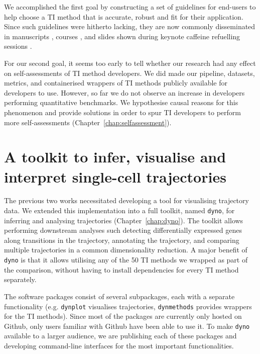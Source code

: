 We accomplished the first goal by constructing a set of guidelines for end-users to help choose a TI method that is accurate, robust and fit for their application. 
Since such guidelines were hitherto lacking, they are now commonly disseminated in manuscripts \cite{lafzi_tutorialguidelinesexperimental_2018,luecken_currentbestpractices_2019}, courses \cite{kiselev_analysissinglecell_2019,martens_analysissinglecell_2019}, and slides shown during keynote caffeine refuelling sessions \cite{hemberg_coffeebreakanalysis_2019}. 

For our second goal, it seems too early to tell whether our research had any effect on self-assessments of TI method developers. We did made our pipeline, datasets, metrics, and containerised wrappers of TI methods publicly available for developers to use.
However, so far we do not observe an increase in developers performing quantitative benchmarks. We hypothesise causal reasons for this phenomenon and provide solutions in order to spur TI developers to perform more self-assessments (Chapter~\ref{chap:selfassessment}).

\section{A toolkit to infer, visualise and interpret single-cell trajectories}

The previous two works necessitated developing a tool for visualising trajectory data. We extended this implementation into a full toolkit, named \texttt{dyno}, for inferring and analysing trajectories (Chapter~\ref{chap:dyno}). The toolkit allows performing downstream analyses such detecting differentially expressed genes along transitions in the trajectory, annotating the trajectory, and comparing multiple trajectories in a common dimensionality reduction. A major benefit of \texttt{dyno} is that it allows utilising any of the 50 TI methods we wrapped as part of the comparison, without having to install dependencies for every TI method separately.

The software packages consist of several subpackages, each with a separate functionality (e.g. \texttt{dynplot} visualises trajectories, \texttt{dynmethods} provides wrappers for the TI methods). Since most of the packages are currently only hosted on Github, only users familiar with Github have been able to use it. To make \texttt{dyno} available to a larger audience, we are publishing each of these packages and developing command-line interfaces for the most important functionalities.


